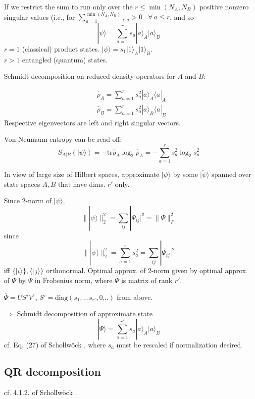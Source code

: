 If we restrict the sum to run only over the $r\leq \min{(N_A,N_B)}$ positive nonzero singular values (i.e., for $\sum_{a=1}^{\min{(N_A,N_B)}}$, $_a>0$ \, $\forall \, a \leq r$, and so 
\[
|\psi \rangle =\sum_{a=1}^r s_a |a\rangle_A |a\rangle_B
\]
$r=1$ (classical) product states.  $|\psi \rangle = s_1 |1\rangle_A |1\rangle_B$.  \\
$r>1$ entangled (quantum) states.  

Schmidt decomposition on reduced density operators for $A$ and $B$:  

\[
\begin{aligned}
	& \widehat{\rho}_A =\sum_{a=1}^r s_a^2 |a\rangle_A \langle a |_A \\ 
	& \widehat{\rho}_B = \sum_{a=1}^r s_a^2 |a\rangle_B \langle a |_B
\end{aligned}
\]
Respective eigenvectors are left and right singular vectors.  

Von Neumann entropy can be read off:  
\[
S_{A|B}(|\psi \rangle) = -\text{tr}\widehat{\rho}_A \log_2{\widehat{\rho}_A} = -\sum_{a=1}^r s_a^2 \log_2{s_a^2}
\]

In view of large size of Hilbert spaces, approximate $| \psi \rangle$ by some $| \widetilde{\psi} \rangle$ spanned over state spaces $A,B$ that have dims. $r'$ only.  

Since 2-norm of $| \psi \rangle$, 
\[
\| | \psi\rangle \|_2^2 = \sum_{ij} |\Psi_{ij} |^2 = \| \Psi \|^2_F
\]
since
\[
\| | \psi\rangle \|_2^2 = \sum_{a=1}^r s_a^2 = \sum_{ij} |\Psi_{ij} |^2
\] 
iff $\lbrace |i \rangle \rbrace , \lbrace | j  \rangle \rbrace$ orthonormal.  Optimal approx. of 2-norm given by optimal approx. of $\Psi$ by $\overline{\Psi}$ in Frobenius norm, where $\overline{\Psi}$ is matrix of rank $r'$.  

$\overline{\Psi} = US'V^{\dag}$, $S' =\text{diag}(s_1 , \dots s_{r'} , 0\dots )$ from above. 

$\Longrightarrow $ Schmidt decomposition of approximate state 
\begin{equation}
| \overline{\Psi}\rangle = \sum_{a=1}^{r'} s_a|a\rangle_A | a \rangle_B
\end{equation}
cf. Eq. (27) of  Schollw\"{o}ck \cite{agat:Scho2010}, where $s_a$ must be rescaled if normalization desired.  

\subsection{QR decomposition}
cf. 4.1.2. of  Schollw\"{o}ck \cite{agat:Scho2010}.  

